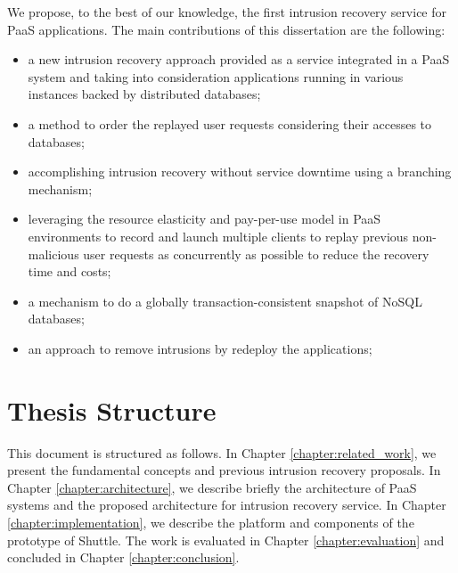 We propose, to the best of our knowledge, the first intrusion recovery service for \ac{PaaS} applications. The main contributions of this dissertation are the following:
\begin{itemize}
\item a new intrusion recovery approach provided as a service integrated in a \ac{PaaS} system and taking into consideration applications running in various instances backed by distributed databases;
\item a method to order the replayed user requests considering their accesses to databases;
\item accomplishing intrusion recovery without service downtime using a branching mechanism;
\item leveraging the resource elasticity and pay-per-use model in \ac{PaaS} environments to record and launch multiple clients to replay previous non-malicious user requests as concurrently as possible to reduce the recovery time and costs;
\item a mechanism to do a globally transaction-consistent snapshot of \acs{NoSQL} databases;
\item an approach to remove intrusions by redeploy the applications;
\end{itemize}


\section{Thesis Structure}\label{sec:introduction:structure}
This document is structured as follows. In Chapter \ref{chapter:related_work}, we present the fundamental concepts and previous intrusion recovery proposals. In Chapter \ref{chapter:architecture}, we describe briefly the architecture of \ac{PaaS} systems and the proposed architecture for intrusion recovery service. In Chapter \ref{chapter:implementation}, we describe the platform and components of the prototype of Shuttle. The work is evaluated in Chapter \ref{chapter:evaluation} and concluded in Chapter \ref{chapter:conclusion}.
